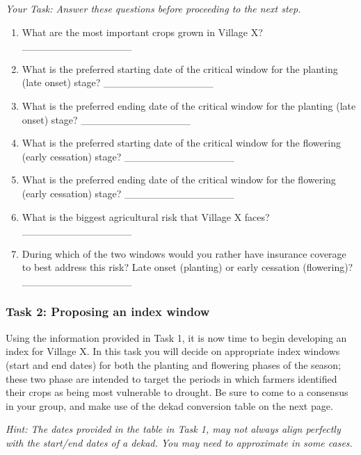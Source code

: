 \documentclass[letterpaper,10pt,english]{sphinxmanual}
\begin{document}
\emph{Your Task: Answer these questions before proceeding to the next step.}
\begin{enumerate}
\item {} 
What are the most important crops grown in Village X? \_\_\_\_\_\_\_\_\_\_\_\_\_\_\_

\item {} 
What is the preferred starting date of the critical window for the planting (late onset) stage? \_\_\_\_\_\_\_\_\_\_\_\_\_\_\_

\item {} 
What is the preferred ending date of the critical window for the planting (late onset) stage? \_\_\_\_\_\_\_\_\_\_\_\_\_\_\_

\item {} 
What is the preferred starting date of the critical window for the flowering (early cessation) stage? \_\_\_\_\_\_\_\_\_\_\_\_\_\_\_

\item {} 
What is the preferred ending date of the critical window for the flowering (early cessation) stage? \_\_\_\_\_\_\_\_\_\_\_\_\_\_\_

\item {} 
What is the biggest agricultural risk that Village X faces? \_\_\_\_\_\_\_\_\_\_\_\_\_\_\_

\item {} 
During which of the two windows would you rather have insurance coverage to best address this risk? Late onset (planting) or early cessation (flowering)? \_\_\_\_\_\_\_\_\_\_\_\_\_\_\_

\end{enumerate}


\subsubsection{Task 2: Proposing an index window}
\label{whatisindexinsurance/designingindexbyhand:task-2-proposing-an-index-window}
Using the information provided in Task 1, it is now time to begin developing an index for Village X. In this task you will decide on appropriate index windows (start and end dates) for both the planting and flowering phases of the season; these two phase are intended to target the periods in which farmers identified their crops as being most vulnerable to drought. Be sure to come to a consensus in your group, and make use of the dekad conversion table on the next page.

\emph{Hint: The dates provided in the table in Task 1, may not always align perfectly with the start/end dates of a dekad. You may need to approximate in some cases.}
\end{document}
